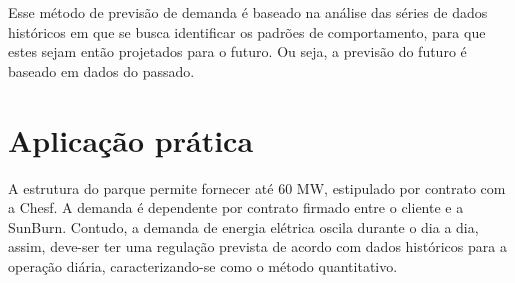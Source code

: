 Esse método de previsão de demanda é baseado na análise das séries de dados históricos em que se busca identificar os padrões de comportamento, para que estes sejam então projetados para o futuro. Ou seja, a previsão do futuro é baseado em dados do passado.

\section{Aplicação prática}
\label{sec:introducao_ao_planejamento_aplicacao}
A estrutura do parque permite fornecer até 60 MW, estipulado por contrato com a Chesf. A demanda é dependente por contrato firmado entre o cliente e a SunBurn. Contudo, a demanda de energia elétrica oscila durante o dia a dia, assim, deve-ser ter uma regulação prevista de acordo com dados históricos para a operação diária, caracterizando-se como o método quantitativo.
